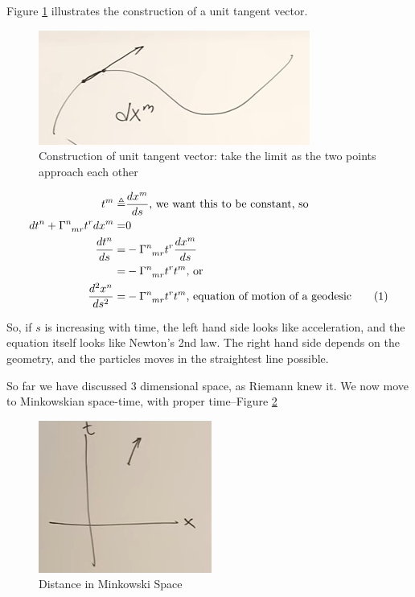 \documentclass[]{article}
\newcommand\numberthis{\addtocounter{equation}{1}\tag{\theequation}}
\begin{document}
{Figure \ref{fig:gr-4-tangent-vector} illustrates the construction of a unit tangent vector.
\begin{figure}[H]
	\caption[Construction of unit tangent vector]{Construction of unit tangent vector: take the limit as the two points approach each other}\label{fig:gr-4-tangent-vector}
	\includegraphics{gr-4-tangent-vector}
\end{figure}

\begin{align*}
	t^m \triangleq& \frac{d x^m}{ds} \text{, we want this to be constant, so}\\
	dt^n + \Gamma \indices{^n_{mr}} t^r dx^m =& 0\\
	\frac{dt^n}{ds}  =& - \Gamma \indices{^n_{mr}} t^r \frac{dx^m}{ds} \\
	=& - \Gamma \indices{^n_{mr}} t^r t^m \text{, or}\\
	\frac{d^2 x^n }{ds^2}=& - \Gamma \indices{^n_{mr}} t^r t^m \text{, equation of motion of a geodesic} \numberthis \label{eq:geodesic}
\end{align*}

So, if $s$ is increasing with time, the left hand side looks like acceleration, and the equation itself looks like Newton's 2nd law. The right hand side depends on the geometry, and the particles moves in the straightest line possible.

So far we have discussed 3 dimensional space, as Riemann knew it. We now move to Minkowskian space-time, with proper time--Figure \ref{fig:gr-4-minkowski-space}

\begin{figure}[H]
	\begin{center}
		\caption{Distance in Minkowski Space}\label{fig:gr-4-minkowski-space}
		\includegraphics{gr-4-minkowski-space}
	\end{center}
\end{figure}


}
\end{document}
